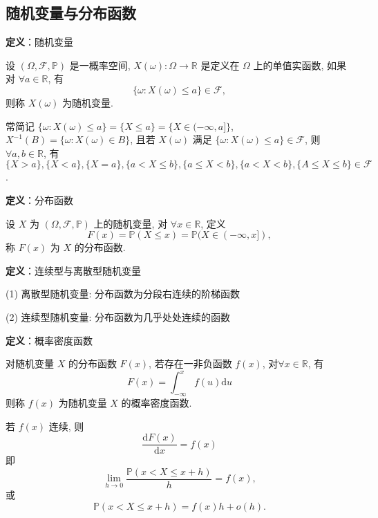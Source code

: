 \documentclass[openany]{ctexbook}
\theoremstyle{kaiti}
\theoremstyle{normal}
\begin{document}
\subsection{随机变量与分布函数}

\textbf{定义}：随机变量

设 $(\Omega,\mathcal{F},\mathbb{P})$ 是一概率空间, $X(\omega):\Omega\to\mathbb{R}$ 是定义在 $\Omega$ 上的单值实函数, 如果对 $\forall a\in\mathbb{R}$, 有
\begin{equation}
  \{\omega:X(\omega)\leqslant a\}\in\mathcal{F},
\end{equation}
则称 $X(\omega)$ 为随机变量.

常简记 $\{\omega:X(\omega)\leqslant a\}=\{X\leqslant a\}=\{X\in(-\infty,a]\}$, $X^{-1}(B)=\{\omega:X(\omega)\in B\}$, 且若 $X(\omega)$ 满足 $\{\omega:X(\omega)\leqslant a\}\in\mathcal{F}$, 则 $\forall a,b\in\mathbb{R}$, 有 $\{X>a\},\{X<a\},\{X=a\},\{a<X\leqslant b\},\{a\leqslant X<b\},\{a<X<b\},\{A\leqslant X\leqslant b\}\in\mathcal{F}$.

\textbf{定义}：分布函数

设 $X$ 为 $(\Omega,\mathcal{F},\mathbb{P})$ 上的随机变量, 对 $\forall x\in\mathbb{R}$, 定义
\begin{equation}
  F(x)=\mathbb{P}(X\leqslant x)=\mathbb{P}(X\in(-\infty,x]),
\end{equation}
称 $F(x)$ 为 $X$ 的分布函数.

\textbf{定义}：连续型与离散型随机变量

(1) 离散型随机变量: 分布函数为分段右连续的阶梯函数

(2) 连续型随机变量: 分布函数为几乎处处连续的函数

\textbf{定义}：概率密度函数

对随机变量 $X$ 的分布函数 $F(x)$, 若存在一非负函数 $f(x)$, 对$\forall x\in\mathbb{R}$, 有
\begin{equation}
  F(x)=\int_{-\infty}^xf(u)\mathrm{d}u
\end{equation}
则称 $f(x)$ 为随机变量 $X$ 的概率密度函数.

若 $f(x)$ 连续, 则
\begin{equation}
  \frac{\mathrm{d}F(x)}{\mathrm{d}x}=f(x)
\end{equation}
即
\begin{equation}
  \lim_{h\to0}\frac{\mathbb{P}(x<X\leqslant x+h)}{h}=f(x),
\end{equation}
或
\begin{equation}
  \mathbb{P}(x<X\leqslant x+h)=f(x)h+o(h).
\end{equation}
\end{document}
